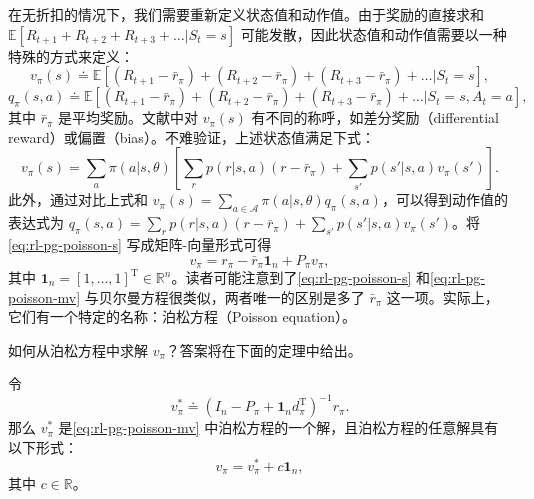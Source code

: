 在无折扣的情况下，我们需要重新定义状态值和动作值。由于奖励的直接求和 $\mathbb{E}[R_{t+1} + R_{t+2} + R_{t+3} + \dots |S_t = s]$ 可能发散，因此状态值和动作值需要以一种特殊的方式来定义：
\begin{equation}
v_{\pi}(s) \doteq \mathbb{E}[(R_{t+1} - \bar{r}_{\pi}) + (R_{t+2} - \bar{r}_{\pi}) + (R_{t+3} - \bar{r}_{\pi}) + \ldots | S_t = s],
\end{equation}
\begin{equation}
q_{\pi}(s,a) \doteq \mathbb{E}[(R_{t+1} - \bar{r}_{\pi}) + (R_{t+2} - \bar{r}_{\pi}) + (R_{t+3} - \bar{r}_{\pi}) + \ldots | S_t = s, A_t = a],
\end{equation}
其中 $\bar{r}_{\pi}$ 是平均奖励。文献中对 $v_{\pi}(s)$ 有不同的称呼，如差分奖励（differential reward）或偏置（bias）。不难验证，上述状态值满足下式：
\begin{equation}
v_{\pi}(s) = \sum_{a} \pi(a|s,\theta) \left[ \sum_{r} p(r|s,a)(r - \bar{r}_{\pi}) + \sum_{s'} p(s'|s,a) v_{\pi}(s') \right].
\label{eq:rl-pg-poisson-s}
\end{equation}
此外，通过对比上式和 $v_{\pi}(s) = \sum_{a\in \mathcal{A}}\pi(a|s,\theta)q_{\pi}(s,a)$，可以得到动作值的表达式为 $q_{\pi}(s,a) = \sum_r p(r|s,a)(r - \bar{r}_{\pi}) + \sum_{s'}p(s'|s,a)v_{\pi}(s')$。将\cref{eq:rl-pg-poisson-s} 写成矩阵-向量形式可得
\begin{equation}
v_{\pi} = r_{\pi} - \bar{r}_{\pi} \mathbf{1}_n + P_{\pi} v_{\pi},
\label{eq:rl-pg-poisson-mv}
\end{equation}
其中 $\mathbf{1}_n = [1, \dots, 1]^{\mathrm{T}} \in \mathbb{R}^n$。读者可能注意到了\cref{eq:rl-pg-poisson-s} 和\cref{eq:rl-pg-poisson-mv} 与贝尔曼方程很类似，两者唯一的区别是多了 $\bar{r}_{\pi}$ 这一项。实际上，它们有一个特定的名称：泊松方程（Poisson equation）。

如何从泊松方程中求解 $v_{\pi}$？答案将在下面的定理中给出。

\begin{theorem}[泊松方程的解]
\label{thm:rl-pg-9-4}
令
\begin{equation}
v_{\pi}^{*} \doteq (I_n - P_{\pi} + \mathbf{1}_n d_{\pi}^{\mathrm{T}})^{-1} r_{\pi}.
\label{eq:rl-pg-poisson-sol}
\end{equation}
那么 $v_{\pi}^{*}$ 是\cref{eq:rl-pg-poisson-mv} 中泊松方程的一个解，且泊松方程的任意解具有以下形式：
\begin{equation}
v_{\pi} = v_{\pi}^{*} + c \mathbf{1}_n,
\end{equation}
其中 $c \in \mathbb{R}$。
\end{theorem}

